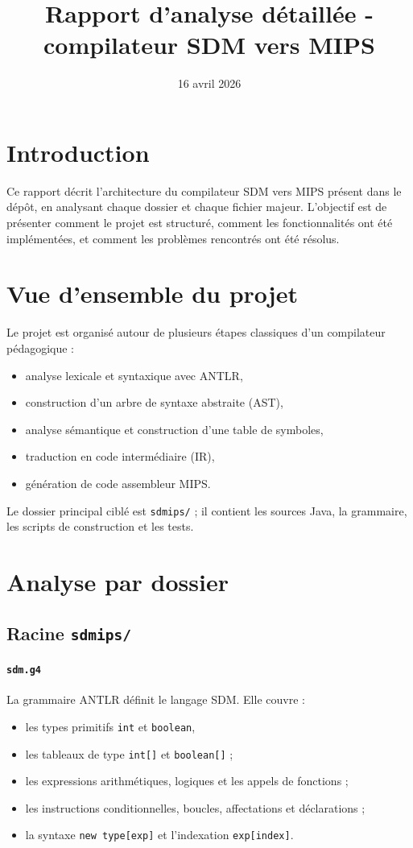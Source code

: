 \documentclass[a4paper,11pt]{article}
\title{Rapport d'analyse détaillée - compilateur SDM vers MIPS}
\author{}
\date{16 avril 2026}
\begin{document}
\maketitle

\section*{Introduction}
Ce rapport décrit l'architecture du compilateur SDM vers MIPS présent dans le dépôt, en analysant chaque dossier et chaque fichier majeur. L'objectif est de présenter comment le projet est structuré, comment les fonctionnalités ont été implémentées, et comment les problèmes rencontrés ont été résolus.

\section{Vue d'ensemble du projet}
Le projet est organisé autour de plusieurs étapes classiques d'un compilateur pédagogique :
\begin{itemize}
  \item analyse lexicale et syntaxique avec ANTLR,
  \item construction d'un arbre de syntaxe abstraite (AST),
  \item analyse sémantique et construction d'une table de symboles,
  \item traduction en code intermédiaire (IR),
  \item génération de code assembleur MIPS.
\end{itemize}

Le dossier principal ciblé est \texttt{sdmips/} ; il contient les sources Java, la grammaire, les scripts de construction et les tests.

\section{Analyse par dossier}

\subsection{Racine \texttt{sdmips/}}
\paragraph{\texttt{sdm.g4}}
La grammaire ANTLR définit le langage SDM. Elle couvre :
\begin{itemize}
  \item les types primitifs \texttt{int} et \texttt{boolean},
  \item les tableaux de type \texttt{int[]} et \texttt{boolean[]} ;
  \item les expressions arithmétiques, logiques et les appels de fonctions ;
  \item les instructions conditionnelles, boucles, affectations et déclarations ;
  \item la syntaxe \texttt{new type[exp]} et l'indexation \texttt{exp[index]}. 
\end{itemize}
\end{document}
